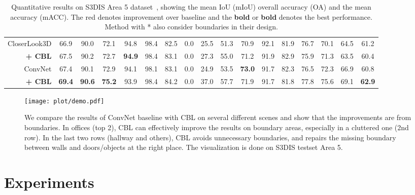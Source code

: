 \documentclass[10pt,twocolumn,letterpaper]{article}
\begin{document}
\begin{table*}
\begin{center}
{\begin{tabular}{r |c c c | c c c c c c c c c c c c c}
\hline
CloserLook3D\cite{closerlook} & 66.9 & 90.0 & 72.1 & 94.8 & 98.4 & 82.5 & 0.0 & 25.5 & 51.3 & 70.9 & 92.1 & 81.9 & 76.7 & 70.1 & 64.5 & 61.2 \\
\textbf{ + CBL} & {\color{red} 67.5} & {\color{red} 90.2} & {\color{red} 72.7} & \textbf{\color{red} 94.9} &{98.4} & {\color{red} 83.1} & 0.0 & {\color{red} 27.3} & {\color{red} 55.0} & {\color{red} 71.2} & 91.9 & {\color{red} 82.9} & 75.9 & {\color{red} 71.3} & 63.5 & 60.4 \\
\hline
ConvNet & 67.4 & 90.1 & 72.9 & 94.1 & 98.1 & 83.1 & 0.0 & 24.9 & 53.5 & \textbf{73.0} & 91.7 & 82.3 & 76.5 & 72.3 & 66.9 & 60.8 \\
\textbf{ + CBL} & \textbf{\color{red}69.4} & \textbf{\color{red}90.6} & \textbf{\color{red}75.2} & 93.9 & {\color{red}98.4} & {\color{red}84.2} & 0.0 & {\color{red}37.0} & {\color{red}57.7} & 71.9 & 91.7 & 81.8 & {\color{red}77.8} & {\color{red}75.6} & {\color{red}69.1} & \textbf{\color{red}62.9} \\
\hline
\end{tabular}
}\end{center}
\caption{
Quantitative results on S3DIS Area 5 dataset~\cite{s3dis}, showing the mean IoU (mIoU) overall accuracy (OA) and the mean accuracy (mACC).
The {\color{red}red} denotes improvement over baseline and the \textbf{bold} or \textbf{\color{red}bold} denotes the best performance. Method with * also consider boundaries in their design.
}
\label{tbl:s3dis}
\end{table*}




\begin{figure*}
\begin{center}
    \texttt{[image: plot/demo.pdf]}
\end{center}
   \caption{We compare the results of ConvNet baseline with CBL on several different scenes and show that the improvements are from boundaries. In offices (top 2), CBL can effectively improve the results on boundary areas, especially in a cluttered one (2nd row). In the last two rows (hallway and others), CBL avoids unnecessary boundaries, and repairs the missing boundary between walls and doors/objects at the right place.
   The visualization is done on S3DIS testset Area 5.
   }
\label{fig:demo}
\end{figure*}

\section{Experiments}
\end{document}
